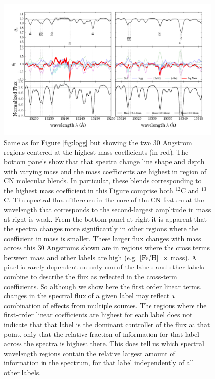 \documentclass[12pt, preprint]{aastex}
\newcommand{\feh}{\mbox{$\rm [Fe/H]$}}
\begin{document}
\begin{figure}[p]
\centering
    \includegraphics[scale=0.51]{./plots/coeffs_m_3.png}
  \caption{Same as for Figure \ref{fig:logg} but showing the two 30 Angstrom regions centered at the highest mass coefficients (in red). The bottom panels show that that spectra change line shape and depth with varying mass and the mass coefficients are highest in region of CN molecular blends. In particular, these blends corresponding to the highest mass coefficient in this Figure comprise both $^{12}$C and $^{13}$C. The spectral flux difference in the core of the CN feature at the wavelength that corresponds to the second-largest amplitude in mass at right is weak. From the bottom panel at right it is apparent that the spectra changes more significantly in other regions where the coefficient in mass is smaller. These larger flux changes with mass across this 30 Angstroms shown are in regions where the cross terms between mass and other labels are high (e.g. \feh\ $\times$ mass). A pixel is rarely dependent on only one of the labels and other labels combine to describe the flux as reflected in the cross-term coefficients.  So although we show here the first order linear terms, changes in the spectral flux of a given label may reflect a combination of effects from multiple sources. The regions where the first-order linear coefficients are highest for each label does not indicate that that label is the dominant controller of the flux at that point, only that the relative fraction of information for that label across the spectra is highest there. This does tell us which spectral wavelength regions contain the relative largest amount of information in the spectrum, for that label independently of all other labels.}
\label{fig:mass}
\end{figure}
\end{document}
